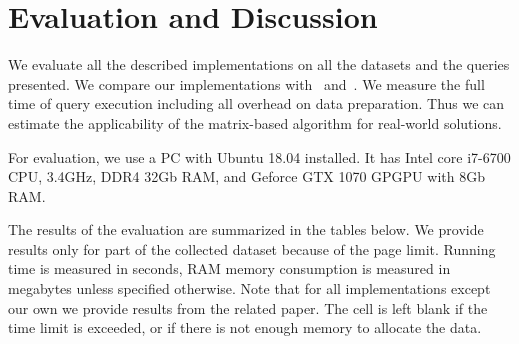 \section{Evaluation and Discussion}

We evaluate all the described implementations on all the datasets and the queries presented.
We compare our implementations with~\cite{Mishin:2019:ECP:3327964.3328503} and~\cite{Kuijpers:2019:ESC:3335783.3335791}.
We measure the full time of query execution including all overhead on data preparation.
Thus we can estimate the applicability of the matrix-based algorithm for real-world solutions.

For evaluation, we use a PC with Ubuntu 18.04 installed.
It has Intel core i7-6700 CPU, 3.4GHz, DDR4 32Gb RAM, and Geforce GTX 1070 GPGPU with 8Gb RAM.

The results of the evaluation are summarized in the tables below.
We provide results only for part of the collected dataset because of the page limit.
Running time is measured in seconds, RAM memory consumption is measured in megabytes unless specified otherwise.
Note that for all implementations except our own we provide results from the related paper.
The cell is left blank if the time limit is exceeded, or if there is not enough memory to allocate the data.

